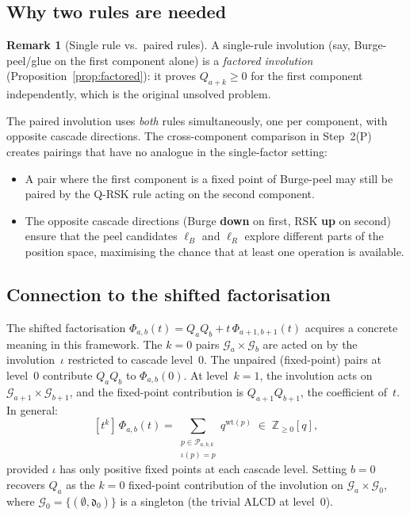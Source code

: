 \documentclass[11pt]{article}
\newcommand{\Z}{\mathbb{Z}}
\theoremstyle{plain}
\theoremstyle{definition}
\newtheorem{remark}[theorem]{Remark}
\begin{document}
\subsection{Why two rules are needed}

\begin{remark}[Single rule vs.\ paired rules]
\label{rem:single-vs-paired}
A single-rule involution (say, Burge-peel/glue on the first
component alone) is a \emph{factored involution}
(Proposition~\ref{prop:factored}): it proves $Q_{a+k} \geq 0$
for the first component independently, which is the original
unsolved problem.

The paired involution uses \emph{both} rules simultaneously,
one per component, with opposite cascade directions.  The
cross-component comparison in Step~2(P) creates pairings that
have no analogue in the single-factor setting:
\begin{itemize}
  \item A pair where the first component is a fixed point of
    Burge-peel may still be paired by the Q-RSK rule acting on
    the second component.
  \item The opposite cascade directions (Burge \textbf{down}
    on first, RSK \textbf{up} on second) ensure that the peel
    candidates $\ell_B$ and $\ell_R$ explore different parts
    of the position space, maximising the chance that at least
    one operation is available.
\end{itemize}
\end{remark}


\subsection{Connection to the shifted factorisation}

The shifted factorisation
$\Phi_{a,b}(t) = Q_a Q_b + t\,\Phi_{a+1,b+1}(t)$ acquires a
concrete meaning in this framework.  The $k = 0$ pairs
$\mathcal{G}_a \times \mathcal{G}_b$ are acted on by the
involution~$\iota$ restricted to cascade level~$0$.  The
unpaired (fixed-point) pairs at level~$0$ contribute $Q_a Q_b$
to $\Phi_{a,b}(0)$.  At level~$k = 1$, the involution acts on
$\mathcal{G}_{a+1} \times \mathcal{G}_{b+1}$, and the
fixed-point contribution is $Q_{a+1} Q_{b+1}$, the coefficient
of~$t$.  In general:
\[
  [t^k]\, \Phi_{a,b}(t)
  = \sum_{\substack{p \in \mathcal{P}_{a,b,k} \\
    \iota(p) = p}}
  q^{\mathrm{wt}(p)}
  \;\in\; \Z_{\geq 0}[q],
\]
provided $\iota$ has only positive fixed points at each cascade
level.  Setting $b = 0$ recovers $Q_a$ as the $k = 0$
fixed-point contribution of the involution on
$\mathcal{G}_{a} \times \mathcal{G}_{0}$, where
$\mathcal{G}_0 = \{(\emptyset, \mathfrak{d}_0)\}$ is a
singleton (the trivial ALCD at level~$0$).
\end{document}
